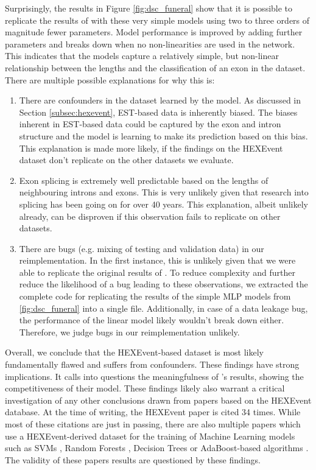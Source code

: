 Surprisingly, the results in Figure \ref{fig:dsc_funeral} show that it is possible to replicate the results of \cite{dsc} with these very simple models using two to three orders of magnitude fewer parameters. Model performance is improved by adding further parameters and breaks down when no non-linearities are used in the network. This indicates that the models capture a relatively simple, but non-linear relationship between the lengths and the classification of an exon in the dataset. 
There are multiple possible explanations for why this is:
\begin{enumerate}
	\item There are confounders in the dataset learned by the model. As discussed in Section \ref{subsec:hexevent}, EST-based data is inherently biased. The biases inherent in EST-based data could be captured by the exon and intron structure and the model is learning to make its prediction based on this bias. This explanation is made more likely, if the findings on the HEXEvent dataset don't replicate on the other datasets we evaluate.
	\item Exon splicing is extremely well predictable based on the lengths of neighbouring introns and exons. This is very unlikely given that research into splicing has been going on for over 40 years. This explanation, albeit unlikely already, can be disproven if this observation fails to replicate on other datasets.
	\item There are bugs (e.g. mixing of testing and validation data) in our reimplementation. In the first instance, this is unlikely given that we were able to replicate the original results of \cite{dsc}. To reduce complexity and further reduce the likelihood of a bug leading to these observations, we extracted the complete code for replicating the results of the simple MLP models from \ref{fig:dsc_funeral} into a single file. Additionally, in case of a data leakage bug, the performance of the linear model likely wouldn't break down either. Therefore, we judge bugs in our reimplementation unlikely.
\end{enumerate}

Overall, we conclude that the HEXEvent-based dataset is most likely fundamentally flawed and suffers from confounders.
These findings have strong implications. It calls into questions the meaningfulness of \cite{dsc}'s results, showing the competitiveness of their model. These findings likely also warrant a critical investigation of any other conclusions drawn from papers based on the HEXEvent database. At the time of writing, the HEXEvent paper is cited 34 times. While most of these citations are just in passing, there are also multiple papers which use a HEXEvent-derived dataset for the training of Machine Learning models such as SVMs \cite{buschhertel}, Random Forests \cite{flawed4} \cite{flawed1}, Decision Trees \cite{flawed2} or AdaBoost-based algorithms \cite{flawed3}. The validity of these papers results are questioned by these findings.

